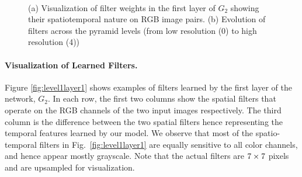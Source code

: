 \documentclass[10pt,twocolumn,letterpaper]{article}
\begin{document}
\begin{figure}[t]
\begin{center}
~
\end{center}     %
\vspace{-0.1in}
\caption{(a) Visualization of filter weights in the first layer of $G_2$ showing their spatiotemporal nature on RGB image pairs. (b) Evolution of filters across the pyramid levels (from low resolution (0) to high resolution (4))}
\end{figure}
\paragraph{Visualization of Learned Filters.}
 Figure \ref{fig:level1layer1} shows examples of  filters learned by the first layer of the network, $G_2$. 
In each row, the first two columns show the spatial filters that operate on the RGB channels of the two input images respectively. 
The third column is the difference between the two spatial filters hence representing the temporal features learned by our model. 
We observe that most of the spatio-temporal filters in Fig.~\ref{fig:level1layer1} are equally sensitive to all color channels, and hence appear mostly grayscale.
Note that the actual filters are $7\times\/ 7$ pixels and are upsampled for visualization.
 
\end{document}
